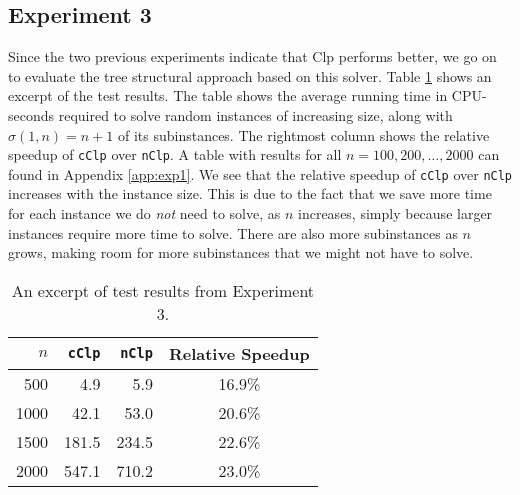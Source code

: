 \subsection*{Experiment 3}
Since the two previous experiments indicate that Clp performs better, we
go on to evaluate the tree structural approach based on this solver.
Table \ref{table:expfour} shows an excerpt of the test results. The table
shows the average running time in CPU-seconds required to solve random
instances of increasing size, along with $\sigma(1, n) = n + 1$ of its
subinstances.
The rightmost column shows the relative speedup of \texttt{cClp} over
\texttt{nClp}.
A table with results for all $n=100,200,\ldots,2000$ can found in Appendix
\ref{app:exp1}.
We see that the relative speedup of \texttt{cClp} over \texttt{nClp}
increases with the instance size.
This is due to the fact that we save more time for each instance we do
\emph{not} need to solve, as $n$ increases, simply because larger instances
require more time to solve.
There are also more subinstances as $n$ grows, making room for more subinstances
that we might not have to solve.

\begin{table}[ht!]
    \centering
    \caption{An excerpt of test results from Experiment 3.}
    \label{table:expfour}
\begin{tabular}{rrrc}
    $n$ & \texttt{cClp}  & \texttt{nClp}  & Relative Speedup \\ \hline
    500 & 4.9   & 5.9   & 16.9\% \\
   1000 & 42.1  & 53.0  & 20.6\% \\
   1500 & 181.5 & 234.5 & 22.6\% \\
   2000 & 547.1 & 710.2 & 23.0\%
\end{tabular}
\end{table}

